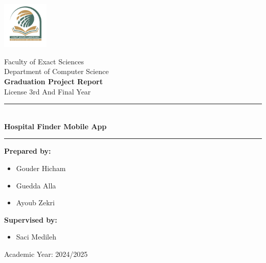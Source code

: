 \documentclass[12pt]{report}
\begin{document}
\begin{center}
\begin{center}
\begin{minipage}{0.1\textwidth}
			\centering
			\includegraphics[width=2.2cm]{images/uni_logo.jpg}
		\end{minipage}
	\end{center}
	\vspace{0.5cm}
	\fontsize{12}{20}\selectfont
	Faculty of Exact Sciences \\
	Department of Computer Science \\
	\vspace{0.5cm}
	\textbf{Graduation Project Report} \\
	License 3rd And Final Year \\
	\rule{0.85\linewidth}{0.5pt} \\[0.3cm]
	\textbf{\Large Hospital Finder Mobile App}
	\rule{0.85\linewidth}{0.5pt}  \vspace{1cm}
	\begin{flushright}
		\begin{minipage}[t]{0.8\textwidth} %
			\begin{minipage}[t]{0.48\textwidth}
				\hspace*{-1.7cm}
				\textbf{Prepared by:} \\[-7.7ex]
				\begin{itemize} \setlength\itemsep{0em}
					\setlength\itemsep{-0.8em}
					\setlength{}
					\setlength{}
					\item \hspace*{-1.9cm} Gouder Hicham
					\item \hspace*{-1.9cm} Guedda Alla
					\item \hspace*{-1.9cm} Ayoub Zekri
				\end{itemize}

			\end{minipage}%
			\hfill
			\begin{minipage}[t]{0.48\textwidth}
				\hspace*{0.5cm}
				\textbf{Supervised by:} \\[-7.7ex]
				\begin{itemize} \setlength\itemsep{0em}
					\setlength\itemsep{-0.8em}
					\setlength{}
					\setlength{}
					\item \hspace*{0.3cm} Saci Medileh
				\end{itemize}
			\end{minipage}
		\end{minipage}
	\end{flushright}
	\vspace{5cm}
	\Large Academic Year: 2024/2025 \\
	\vfill
\end{center}
\end{document}
